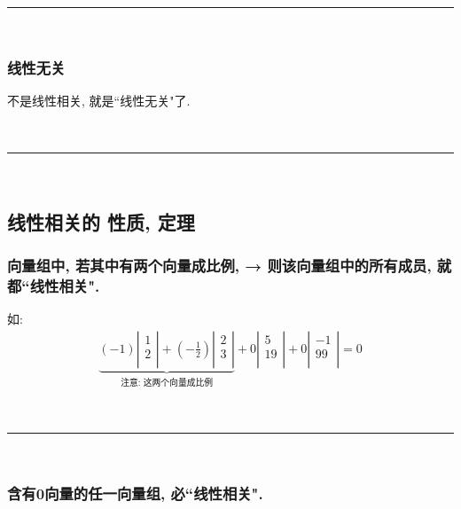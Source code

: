 \documentclass[UTF8]{ctexart}
\begin{document}
~\\
\hrule
~\\

\subsubsection{线性无关}

不是线性相关, 就是``线性无关"了.

~\\
\hrule
~\\

\subsection{线性相关的 性质, 定理}

\subsubsection{向量组中, 若其中有两个向量成比例, → 则该向量组中的所有成员, 就都``线性相关".}

如:
\begin{align*}
	\underset{ \text{注意:\ 这两个向量成比例}}{\underbrace{(-1)\left| \begin{array}{l}
				1 \\
				2 \\
			\end{array} \right|+(-\frac{1}{2})\left| \begin{array}{l}
				2 \\
				3 \\
			\end{array} \right|}}+0\left| \begin{array}{l}
		5  \\
		19 \\
	\end{array} \right|+0\left| \begin{array}{l}
		-1 \\
		99 \\
	\end{array} \right|=0
\end{align*}

~\\
\hrule
~\\

\subsubsection{含有0向量的任一向量组, 必``线性相关".}
\end{document}
